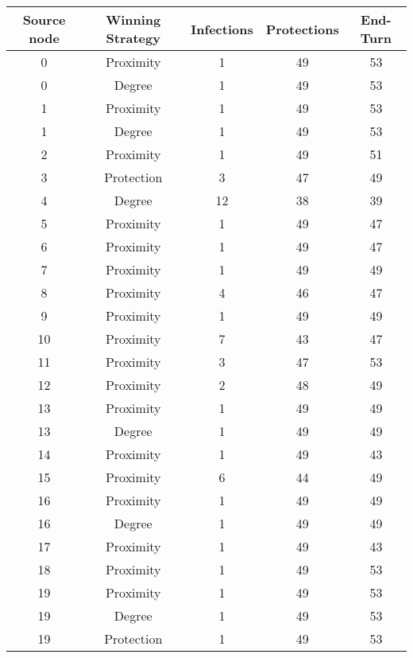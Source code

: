 \documentclass[results.tex]{subfiles}
\begin{document}
\begin{center}
  \begin{tabular}{| c || c | c | c | c |}
    \hline
    {\bfseries Source node} & {\bfseries Winning Strategy} & {\bfseries Infections} & {\bfseries Protections} & {\bfseries End-Turn} \\  %
    \hline\hline
    0 & Proximity & 1 & 49 & 53 \\ 
    \hline
    0 & Degree & 1 & 49 & 53 \\ 
    \hline
    1 & Proximity & 1 & 49 & 53 \\ 
    \hline
    1 & Degree & 1 & 49 & 53 \\ 
    \hline
    2 & Proximity & 1 & 49 & 51 \\ 
    \hline
    3 & Protection & 3 & 47 & 49 \\ 
    \hline
    4 & Degree & 12 & 38 & 39 \\ 
    \hline
    5 & Proximity & 1 & 49 & 47 \\ 
    \hline
    6 & Proximity & 1 & 49 & 47 \\ 
    \hline
    7 & Proximity & 1 & 49 & 49 \\ 
    \hline
    8 & Proximity & 4 & 46 & 47 \\ 
    \hline
    9 & Proximity & 1 & 49 & 49 \\ 
    \hline
    10 & Proximity & 7 & 43 & 47 \\ 
    \hline
    11 & Proximity & 3 & 47 & 53 \\ 
    \hline
    12 & Proximity & 2 & 48 & 49 \\ 
    \hline
    13 & Proximity & 1 & 49 & 49 \\ 
    \hline
    13 & Degree & 1 & 49 & 49 \\ 
    \hline
    14 & Proximity & 1 & 49 & 43 \\ 
    \hline
    15 & Proximity & 6 & 44 & 49 \\ 
    \hline
    16 & Proximity & 1 & 49 & 49 \\ 
    \hline
    16 & Degree & 1 & 49 & 49 \\ 
    \hline
    17 & Proximity & 1 & 49 & 43 \\ 
    \hline
    18 & Proximity & 1 & 49 & 53 \\ 
    \hline
    19 & Proximity & 1 & 49 & 53 \\ 
    \hline
    19 & Degree & 1 & 49 & 53 \\ 
    \hline
    19 & Protection & 1 & 49 & 53 \\ 

\end{tabular}
\end{center}
\end{document}
